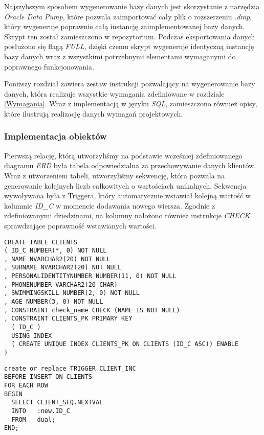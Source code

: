 \documentclass[a4paper]{article}
\begin{document}
Najszybszym sposobem wygenerowanie bazy danych jest skorzystanie z narzędzia \textit{Oracle Data Pump}, które pozwala zaimportować cały plik o rozszerzeniu \textit{.dmp}, który wygeneruje poprawnie całą instancję zaimplementowanej bazy danych. Skrypt ten został zamieszczono w repozytorium. Podczas eksportowania danych posłużono się flagą \textit{FULL}, dzięki czemu skrypt wygeneruje identyczną instancję bazy danych wraz z wszystkimi potrzebnymi elementami wymaganymi do poprawnego funkcjonowania.

Poniższy rozdział zawiera zestaw instrukcji pozwalający na wygenerowanie bazy danych, która realizuje wszystkie wymagania zdefiniowane w rozdziale \ref{Wymagania}. Wraz z implementacją w języku \textit{SQL}, zamieszczono również opisy, które ilustrują realizację danych wymagań projektowych.

\subsubsection{Implementacja obiektów}

Pierwszą relację, którą utworzyliśmy na podstawie wcześniej zdefiniowanego diagramu \textit{ERD} była tabela odpowiedzialna za przechowywanie danych klientów. Wraz z utworzeniem tabeli, utworzyliśmy sekwencję, która pozwala na generowanie kolejnych liczb całkowitych o wartościach unikalnych. Sekwencja wywoływana była z Triggera, który automatycznie wstawiał kolejną wartość w kolumnie \textit{ID\_C} w momencie dodawania nowego wiersza. Zgodnie z zdefiniowanymi dziedzinami, na kolumny nałożono również instrukcje \textit{CHECK} sprawdzające poprawność wstawianych wartości.

\begin{verbatim}
CREATE TABLE CLIENTS 
( ID_C NUMBER(*, 0) NOT NULL 
, NAME NVARCHAR2(20) NOT NULL 
, SURNAME NVARCHAR2(20) NOT NULL 
, PERSONALIDENTITYNUMBER NUMBER(11, 0) NOT NULL 
, PHONENUMBER VARCHAR2(20 CHAR) 
, SWIMMINGSKILL NUMBER(2, 0) NOT NULL 
, AGE NUMBER(3, 0) NOT NULL
, CONSTRAINT check_name CHECK (NAME IS NOT NULL) 
, CONSTRAINT CLIENTS_PK PRIMARY KEY 
  ( ID_C )
  USING INDEX 
  ( CREATE UNIQUE INDEX CLIENTS_PK ON CLIENTS (ID_C ASC)) ENABLE
)
\end{verbatim}

\begin{verbatim}
create or replace TRIGGER CLIENT_INC 
BEFORE INSERT ON CLIENTS
FOR EACH ROW
BEGIN
  SELECT CLIENT_SEQ.NEXTVAL
  INTO   :new.ID_C
  FROM   dual;
END;
\end{verbatim}
\end{document}
